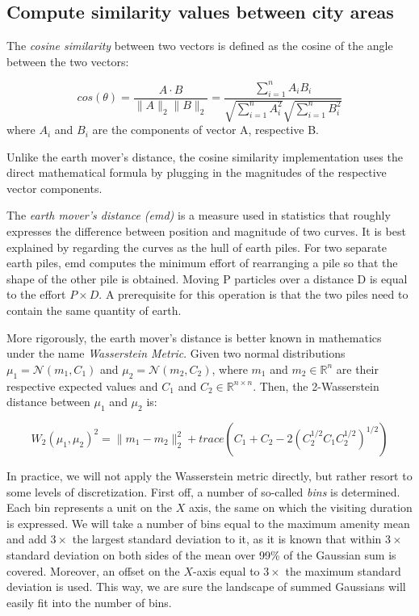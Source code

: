\documentclass{ws-ijait}
\begin{document}
	\subsection{Compute similarity values between city areas}
	The \textit{cosine similarity} between two vectors is defined as the cosine of the angle between the two vectors:
	
	\begin{equation}
	cos(\theta)=\frac{A\cdot B}{{\lVert}A{\rVert}       
		_2{\lVert}B{\rVert}_2}=\frac{\sum_{i=1}^n{A_iB_i}}{\sqrt{\sum_{i=1}^n{A_i^2}}\sqrt{\sum_{i=1}^n{B_i^2}}}
	\end{equation}
	where $A_i$ and $B_i$ are the components of vector A, respective B. 
	
	Unlike the earth mover's distance, the cosine similarity implementation uses the direct mathematical formula by plugging in the magnitudes of the respective vector components.
	
	The \textit{earth mover's distance (emd)} is a measure used in statistics that roughly expresses the difference between position and magnitude of two curves. It is best explained by regarding the curves as the hull of earth piles. For two separate earth piles, emd computes the minimum effort of rearranging a pile so that the shape of the other pile is obtained. Moving P particles over a distance D is equal to the effort $P \times D$. A prerequisite for this operation is that the two piles need to contain the same quantity of earth.
	
	More rigorously, the earth mover's distance is better known in mathematics under the name \textit{Wasserstein Metric}. Given two normal distributions $\mu_1=\mathcal{N}(m_1,C_1)$ and $\mu_2=\mathcal{N}(m_2,C_2)$, where $m_1$ and $m_2 \in \mathbb{R}^{n}$ are their respective expected values and $C_1$ and $C_2 \in \mathbb{R}^{n\times n}$. Then, the 2-Wasserstein distance between $\mu_1$ and $\mu_2$ is:
	
	\begin{equation}
	W_2(\mu_1,\mu_2)^2={\lVert}m_1-m_2{\rVert}^2_2+trace(C_1+C_2-2(C_2^{1/2}C_1C_2^{1/2})^{1/2})
	\end{equation}
	
	In practice, we will not apply the Wasserstein metric directly, but rather resort to some levels of discretization. First off, a number of so-called \textit{bins} is determined. Each bin represents a unit on the $X$ axis, the same on which the visiting duration is expressed. We will take a number of bins equal to the maximum amenity mean and add $3\times$ the largest standard deviation to it, as it is known that within $3\times$ standard deviation on both sides of the mean over 99\% of the Gaussian sum is covered. Moreover, an offset on the $X$-axis equal to $3\times$ the maximum standard deviation is used. This way, we are sure the landscape of summed Gaussians will easily fit into the number of bins.
	
\end{document}

